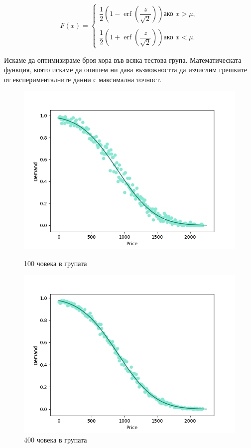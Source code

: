 \documentclass[11pt, a4paper]{article}
\theoremstyle{definition}
\begin{document}
			$$
			F(x)=
			\begin{cases}
				\dfrac{1}{2}\left (1-\operatorname{erf}\left (\dfrac{z}{\sqrt{2}}\right )\right ) \text{ако } x>\mu,\\
				\\
				\dfrac{1}{2}\left (1+\operatorname{erf}\left (\dfrac{z}{\sqrt{2}}\right )\right ) \text{ако } x<\mu.
			\end{cases}
			$$\par
			Искаме да оптимизираме броя хора във всяка тестова група. Математическата функция, която искаме да опишем ни дава възможността да изчислим грешките от експерименталните данни с максимална точност.
			\begin{figure}[H]
				\begin{minipage}{0.48\textwidth}
					\centering
					\includegraphics[width=\linewidth]{Exp_and_math_100}
					\caption{100 човека в групата}\label{Fig:Data3}
				\end{minipage}\hfill
				\begin{minipage}{0.48\textwidth}
					\centering
					\includegraphics[width=\linewidth]{Exp_and_math_400}
					\caption{400 човека в групата}\label{Fig:Data4}
				\end{minipage}
			\end{figure}\par\noindent
\end{document}
